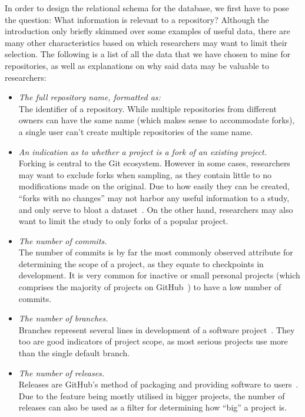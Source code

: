 In order to design the relational schema for the database, we first have to pose the question: What information is relevant to a repository?
Although the introduction only briefly skimmed over some examples of useful data, there are many other characteristics based on which researchers may want to limit their selection.
The following is a list of all the data that we have chosen to mine for repositories, as well as explanations on why said data may be valuable to researchers:
\begin{itemize}
    \item \textit{The full repository name, formatted as:} 
    \\The identifier of a repository. While multiple repositories from different owners can have the same name (which makes sense to accommodate forks), a single user can't create multiple repositories of the same name.
    \item \textit{An indication as to whether a project is a fork of an existing project.}
    \\Forking is central to the Git ecosystem. However in some cases, researchers may want to exclude forks when sampling, as they contain little to no modifications made on the original. Due to how easily they can be created, ``forks with no changes'' may not harbor any useful information to a study, and only serve to bloat a dataset~\cite{FORKS}. On the other hand, researchers may also want to limit the study to only forks of a popular project.
    \item \textit{The number of commits.}
    \\The number of commits is by far the most commonly observed attribute for determining the scope of a project, as they equate to checkpoints in development. It is very common for inactive or small personal projects (which comprises the majority of projects on GitHub~\cite{COMMITS}) to have a low number of commits.
    \item \textit{The number of branches.}
    \\Branches represent several lines in development of a software project~\cite{GIT}. They too are good indicators of project scope, as most serious projects use more than the single default branch.
    \item \textit{The number of releases.}
    \\Releases are GitHub's method of packaging and providing software to users~\cite{GITHUBHELP}. Due to the feature being mostly utilised in bigger projects, the number of releases can also be used as a filter for determining how ``big'' a project is.

\end{itemize}
